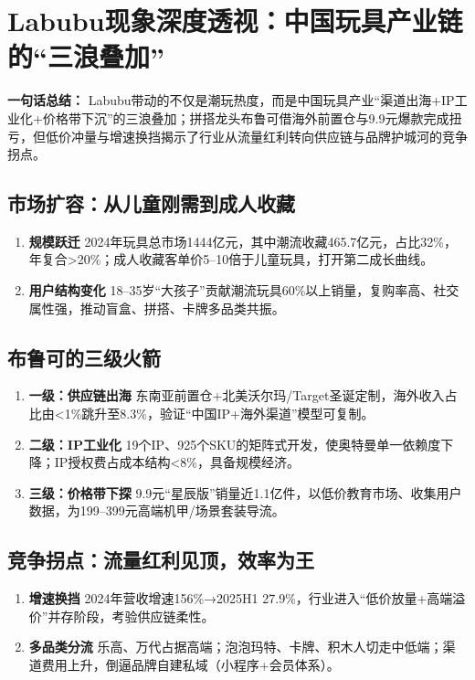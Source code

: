 \section{Labubu现象深度透视：中国玩具产业链的“三浪叠加”}
\textbf{一句话总结：}  
Labubu带动的不仅是潮玩热度，而是中国玩具产业“渠道出海+IP工业化+价格带下沉”的三浪叠加；拼搭龙头布鲁可借海外前置仓与9.9元爆款完成扭亏，但低价冲量与增速换挡揭示了行业从流量红利转向供应链与品牌护城河的竞争拐点。

\subsection{市场扩容：从儿童刚需到成人收藏}
\begin{enumerate}[leftmargin=*, nosep]
    \item \textbf{规模跃迁}  
    2024年玩具总市场1444亿元，其中潮流收藏465.7亿元，占比32\%，年复合>20\%；成人收藏客单价5–10倍于儿童玩具，打开第二成长曲线。
    \item \textbf{用户结构变化}  
    18–35岁“大孩子”贡献潮流玩具60\%以上销量，复购率高、社交属性强，推动盲盒、拼搭、卡牌多品类共振。
\end{enumerate}

\subsection{布鲁可的三级火箭}
\begin{enumerate}[leftmargin=*, nosep]
    \item \textbf{一级：供应链出海}  
    东南亚前置仓+北美沃尔玛/Target圣诞定制，海外收入占比由<1\%跳升至8.3\%，验证“中国IP+海外渠道”模型可复制。
    \item \textbf{二级：IP工业化}  
    19个IP、925个SKU的矩阵式开发，使奥特曼单一依赖度下降；IP授权费占成本结构<8\%，具备规模经济。
    \item \textbf{三级：价格带下探}  
    9.9元“星辰版”销量近1.1亿件，以低价教育市场、收集用户数据，为199–399元高端机甲/场景套装导流。
\end{enumerate}

\subsection{竞争拐点：流量红利见顶，效率为王}
\begin{enumerate}[leftmargin=*, nosep]
    \item \textbf{增速换挡}  
    2024年营收增速156\%→2025H1 27.9\%，行业进入“低价放量+高端溢价”并存阶段，考验供应链柔性。
    \item \textbf{多品类分流}  
    乐高、万代占据高端；泡泡玛特、卡牌、积木人切走中低端；渠道费用上升，倒逼品牌自建私域（小程序+会员体系）。
\end{enumerate}

